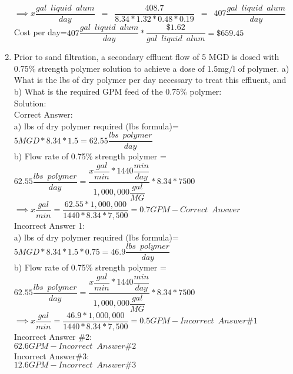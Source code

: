 \begin{enumerate}
$ \implies x \dfrac{gal \enspace liquid \enspace alum}{day}\enspace = \enspace \dfrac{408.7}{8.34*1.32*0.48*0.19} \enspace = \enspace 407 \dfrac{gal \enspace liquid \enspace alum}{day}$\\
\vspace{0.25cm}
Cost per day=$407 \dfrac{gal \enspace liquid \enspace alum}{day}*\dfrac{\$1.62}{gal \enspace liquid \enspace alum}=\boxed{\$659.45}$
\vspace{0.25cm}
\item Prior to sand filtration, a secondary effluent flow of 5 MGD is dosed with 0.75\% strength polymer solution to achieve a dose of 1.5mg/l of polymer.  a) What is the lbs of dry polymer per day necessary to treat this effluent, and b) What is the required GPM feed of the 0.75\% polymer:\\
Solution:\\
Correct Answer:\\
a)  lbs of dry polymer required (lbs formula)=$5MGD*8.34*1.5=\boxed{62.55 \dfrac{lbs \enspace polymer}{day}}$\\
\vspace{0.25cm}
b) Flow rate of 0.75\% strength polymer = $62.55 \dfrac{lbs \enspace polymer}{day}=\dfrac{x \dfrac{gal}{min}*1440\dfrac{min}{day}}{1,000,000\dfrac{gal}{MG}}*8.34*7500$\\
$ \implies x \dfrac{gal}{min}=\dfrac{62.55*1,000,000}{1440*8.34*7,500}=\boxed{0.7GPM} - Correct \enspace Answer$\\
\vspace{0.3cm}
Incorrect Answer 1:\\
a)  lbs of dry polymer required (lbs formula)=$5MGD*8.34*1.5*0.75=\boxed{46.9 \dfrac{lbs \enspace polymer}{day}}$\\
\vspace{0.25cm}
b) Flow rate of 0.75\% strength polymer = $62.55 \dfrac{lbs \enspace polymer}{day}=\dfrac{x \dfrac{gal}{min}*1440\dfrac{min}{day}}{1,000,000\dfrac{gal}{MG}}*8.34*7500$\\
$ \implies x \dfrac{gal}{min}=\dfrac{46.9*1,000,000}{1440*8.34*7,500}=\boxed{0.5GPM} - Incorrect \enspace Answer \#1$\\
\vspace{0.3cm}
Incorrect Answer \#2:\\
$\boxed{62.6GPM} - Incorrect \enspace Answer \#2$\\
\vspace{0.3cm}
Incorrect Answer\#3:\\
$\boxed{12.6GPM} - Incorrect \enspace Answer \#3$


\end{enumerate}
